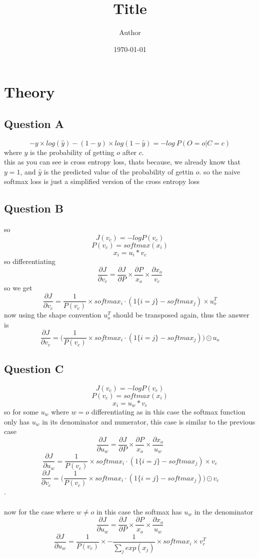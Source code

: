 \documentclass[11pt]{article}
\title{ Title}
\author{ Author }
\date{\today}
\begin{document}
\maketitle	
\pagebreak



\section {Theory}
\subsection{Question A}
$$- y \times log(\hat y) - (1-y) \times log(1-\hat y) = -log\ P(O=o | C=c)$$
where $y$ is the probability of getting $o$ after $c$.\\
this as you can see is cross entropy loss, thats because, we already know that $y = 1$, and $\hat y$ is the predicted value of the probability of gettin $o$. so the naive softmax loss is just a simplified version of the cross entropy loss

\subsection {Question B}
so
$$J(v_c) = - log P (v_c)$$
$$P(v_c) = softmax(x_i)$$
$$x_i = u_i*v_c$$
so differentiating
$$\frac {\partial J} {\partial v_c} = \frac {\partial J} {\partial P} \times \frac{\partial P} {x_o} \times \frac {\partial x_o} {v_c}$$
so we get
$$ \frac{\partial J} {\partial v_c} = \frac 1 {P(v_c)} \times softmax_i \cdot (1\{i=j\} - softmax_j) \times u_o^T$$
now using the shape convention
$u_o^T$ should be transposed again, thus the answer is
$$ \frac{\partial J} {\partial v_c} = \bigg(\frac 1 {P(v_c)} \times softmax_i \cdot (1\{i=j\} - softmax_j)\bigg) \odot u_o$$


\subsection {Question C}
$$J(v_c) = - log P (v_c)$$
$$P(v_c) = softmax(x_i)$$
$$x_i = u_w * v_c$$
so for some $u_w$
where $w = o$
differentiating
as in this case the softmax function only has $u_w$ in its denominator and numerator, this case is similar to the previous case
$$\frac {\partial J} {\partial u_w} = \frac {\partial J} {\partial P} \times \frac{\partial P} {x_o} \times \frac {\partial x_o} {u_w}$$
$$ \frac{\partial J} {\partial u_w} = \frac 1 {P(v_c)} \times softmax_i \cdot (1\{i=j\} - softmax_j) \times v_c$$
$$ \frac{\partial J} {\partial v_c} = \bigg(\frac 1 {P(v_c)} \times softmax_i \cdot (1\{i=j\} - softmax_j)\bigg) \odot v_c$$
.\\\\
now for the case where $w \ne o$
in this case the softmax has $u_w$ in the denominator
$$\frac {\partial J} {\partial u_w} = \frac {\partial J} {\partial P} \times \frac{\partial P} {x_o} \times \frac {\partial x_o} {u_w}$$
$$ \frac{\partial J} {\partial u_w} = \frac 1 {P(v_c)} \times -\frac 1 {\sum_j exp(x_j)}\times softmax_i   \times v_c^T$$
\end{document}
